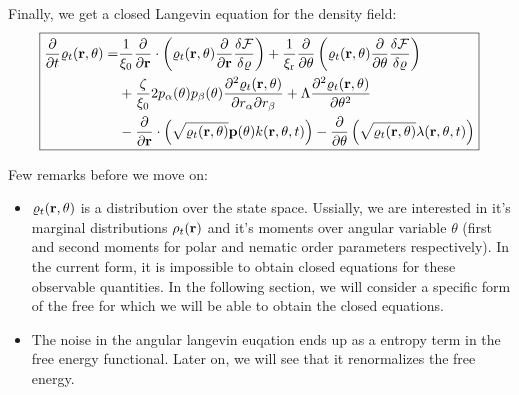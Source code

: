 \documentclass[a5paper]{article}
\begin{document}
Finally, we get a closed Langevin equation for the density field:
\begin{equation}
\boxed{
\begin{aligned}
    \label{final-langevin}
    \frac{\partial }{\partial t}\varrho_t(\mathbf{r}, \theta) = &
    \frac{1}{\xi_0}\frac{\partial }{\partial \mathbf{r}}\cdot\left(\varrho_t(\mathbf{r}, \theta)\frac{\partial }{\partial \mathbf{r}}\frac{\delta\mathcal{F}}{\delta\varrho}\right)
    +\frac{1}{\xi_{\rm r}}\frac{\partial }{\partial \theta}\left(\varrho_t(\mathbf{r}, \theta)\frac{\partial }{\partial \theta}\frac{\delta\mathcal{F}}{\delta\varrho}\right)
    \\
    &+\frac{\zeta}{\xi_0} 2 p_\alpha(\theta) p_\beta(\theta) \frac{\partial^2 \varrho_t(\mathbf{r}, \theta)}{\partial r_{\alpha}\partial r_{\beta}} 
    + \Lambda \frac{\partial^2 \varrho_t(\mathbf{r}, \theta)}{\partial \theta^2}
    \\
        &- \frac{\partial }{\partial \mathbf{r}}\cdot\left(\sqrt{\varrho_t(\mathbf{r}, \theta)}\mathbf{p}(\theta) k(\mathbf{r}, \theta, t)\right)
        - \frac{\partial }{\partial \theta}\left(\sqrt{\varrho_t(\mathbf{r}, \theta)} \lambda(\mathbf{r}, \theta, t)\right)
\end{aligned}
}
\end{equation}


Few remarks before we move on:
\begin{itemize}
    \item $\varrho_t(\mathbf{r}, \theta)$ is a distribution over the state space. Ussially, we are interested in it's marginal distributions $\rho_t(\mathbf{r})$ and it's moments over angular variable $\theta$ (first and second moments for polar and nematic order parameters respectively). In the current form, it is impossible to obtain closed equations for these observable quantities. In the following section, we will consider a specific form of the free for which we will be able to obtain the closed equations.
    \item The noise in the angular langevin euqation ends up as a entropy term in the free energy functional. Later on, we will see that it renormalizes the free energy.
\end{itemize}
\end{document}
